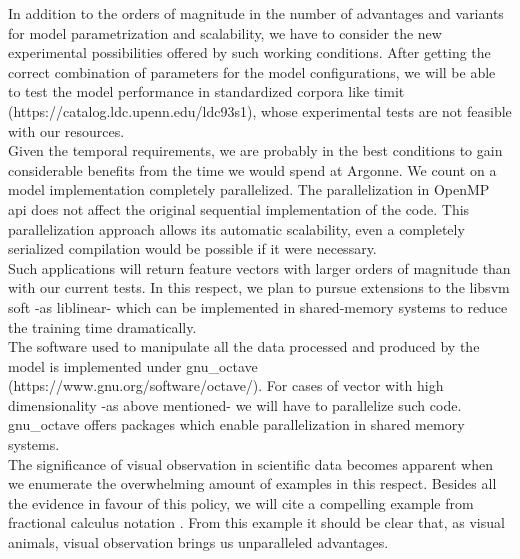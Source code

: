 \documentclass[11pt,a4paper]{article}
\begin{document}
In addition to the orders of magnitude in the number of advantages and variants for 
model parametrization and scalability, we have to consider the new experimental
possibilities offered by such working conditions.
After getting the correct combination of parameters for the model configurations,
we will be able to test the model performance in standardized corpora like
\gls{timit} (https://catalog.ldc.upenn.edu/ldc93s1), whose experimental tests
are not feasible with our resources. \\

Given the temporal requirements, we are probably in the best conditions to gain
considerable benefits from the time we would spend at Argonne.
We count on a model implementation completely parallelized.
The parallelization in OpenMP \gls{api} does not affect the original sequential implementation
of the code. This parallelization approach allows its automatic scalability, even a completely serialized
compilation would be possible if it were necessary. \\

Such applications will return feature vectors with larger orders of magnitude than with our current tests.
In this respect, we plan to pursue extensions to the \gls{libsvm} soft -as \gls{liblinear}- which can be implemented in
shared-memory systems to reduce the training time dramatically. \\

The software used to manipulate all the data processed and produced by the model
is implemented under \gls{gnu_octave} (https://www.gnu.org/software/octave/).
For cases of vector with high dimensionality -as above mentioned-
we will have to parallelize such code.
\gls{gnu_octave} offers packages which enable parallelization in shared memory systems. \\

The significance of visual observation in scientific data becomes apparent
when we enumerate the overwhelming amount of examples in this respect.
Besides all the evidence in favour of this policy, we will cite
a compelling example from fractional calculus notation \cite{Miller_1993}.
From this example it should be clear that, as visual animals,
visual observation brings us unparalleled advantages. \\

 \\
\end{document}
